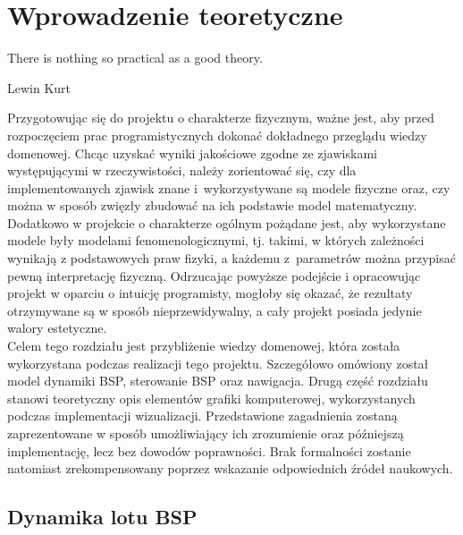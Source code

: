 \section{Wprowadzenie teoretyczne}

\epigraph{There is nothing so practical as a good theory.}{Lewin Kurt}

Przygotowując się do projektu o charakterze fizycznym, ważne jest, aby przed rozpoczęciem prac programistycznych dokonać dokładnego przeglądu wiedzy domenowej. Chcąc uzyskać wyniki jakościowe zgodne ze zjawiskami występującymi w rzeczywistości, należy zorientować się, czy dla implementowanych zjawisk znane i~wykorzystywane są modele fizyczne oraz, czy można w sposób zwięzły zbudować na ich podstawie model matematyczny. Dodatkowo w projekcie o charakterze ogólnym pożądane jest, aby wykorzystane modele były modelami fenomenologicznymi, tj. takimi, w których zależności wynikają z podstawowych praw fizyki, a każdemu z~parametrów można przypisać pewną interpretację fizyczną. Odrzucając powyższe podejście i opracowując projekt w oparciu o intuicję programisty, mogłoby się okazać, że rezultaty otrzymywane są w sposób nieprzewidywalny, a cały projekt posiada jedynie walory estetyczne.\\

Celem tego rozdziału jest przybliżenie wiedzy domenowej, która została wykorzystana podczas realizacji tego projektu. Szczegółowo omówiony został model dynamiki BSP, sterowanie BSP oraz nawigacja. Drugą część rozdziału stanowi teoretyczny opis elementów grafiki komputerowej, wykorzystanych podczas implementacji wizualizacji. Przedstawione zagadnienia zostaną zaprezentowane w sposób umożliwiający ich zrozumienie oraz późniejszą implementację, lecz bez dowodów poprawności. Brak formalności zostanie natomiast zrekompensowany poprzez wskazanie odpowiednich źródeł naukowych.

\subsection{Dynamika lotu BSP}

